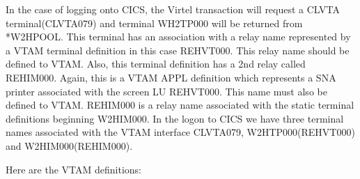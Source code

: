 \documentclass[letterpaper,10pt,english]{sphinxmanual}
\begin{document}
\sphinxAtStartPar
In the case of logging onto CICS, the Virtel transaction will request a CLVTA terminal(CLVTA079) and terminal WH2TP000 will be returned from *W2HPOOL. This terminal has an association with a relay name represented by a VTAM terminal definition \sphinxhyphen{} in this case REHVT000. This relay name should be defined to VTAM. Also, this terminal definition has a 2nd relay called REHIM000. Again, this is a VTAM APPL definition which represents a SNA printer associated with the screen LU REHVT000. This name must also be defined to VTAM. REHIM000 is a relay name associated with the static terminal definitions beginning W2HIM000. In the logon to CICS we have three terminal names associated with the VTAM interface \sphinxhyphen{} CLVTA079, W2HTP000(REHVT000) and W2HIM000(REHIM000).

\sphinxAtStartPar
Here are the VTAM definitions:\sphinxhyphen{}
\end{document}
